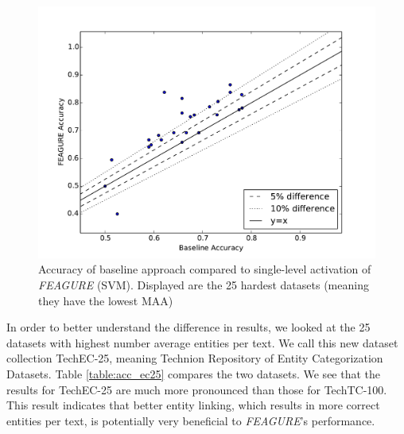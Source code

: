\documentclass[twoside,11pt]{article}
\theoremstyle{definition}
\begin{document}
\begin{figure}
	\centering
	\includegraphics[width=0.8\linewidth]{25best}
	\caption{Accuracy of
		baseline approach compared to single-level activation of \emph{FEAGURE} (SVM). Displayed are the 25 hardest datasets (meaning they have the lowest MAA)}
	\label{fig:25best}
\end{figure}

In order to better understand the difference in results, we looked at the 25 datasets with highest number average entities per text. We call this new dataset collection TechEC-25, meaning Technion Repository of Entity Categorization Datasets.
Table \ref{table:acc_ec25} compares the two datasets. We see that the results for TechEC-25 are much more pronounced than those for TechTC-100. This result indicates that better entity linking, which results in more correct entities per text, is potentially very beneficial to \emph{FEAGURE}'s performance.
\end{document}
